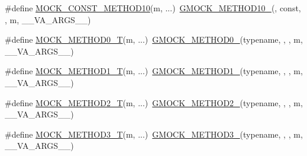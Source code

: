 \begin{DoxyCompactItemize}
\item 
\#define \mbox{\hyperlink{_obj__test_2lib_2googletest-master_2googlemock_2include_2gmock_2gmock-generated-function-mockers_8h_a4f16ede0ef660fb6dc49e5f5d226fbf9}{M\+O\+C\+K\+\_\+\+C\+O\+N\+S\+T\+\_\+\+M\+E\+T\+H\+O\+D10}}(m, ...)~\mbox{\hyperlink{_obj__test_2lib_2googletest-release-1_88_81_2googlemock_2include_2gmock_2gmock-generated-function-mockers_8h_a81a48223a8771de36ef92ac6d56f6e81}{G\+M\+O\+C\+K\+\_\+\+M\+E\+T\+H\+O\+D10\+\_\+}}(, const, , m, \+\_\+\+\_\+\+V\+A\+\_\+\+A\+R\+G\+S\+\_\+\+\_\+)
\item 
\#define \mbox{\hyperlink{_obj__test_2lib_2googletest-master_2googlemock_2include_2gmock_2gmock-generated-function-mockers_8h_a55a5a1a22cec416ead5605a2da39eec8}{M\+O\+C\+K\+\_\+\+M\+E\+T\+H\+O\+D0\+\_\+T}}(m, ...)~\mbox{\hyperlink{_obj__test_2lib_2googletest-release-1_88_81_2googlemock_2include_2gmock_2gmock-generated-function-mockers_8h_ae0d290ffa58d7c624b2e3487ba1252f4}{G\+M\+O\+C\+K\+\_\+\+M\+E\+T\+H\+O\+D0\+\_\+}}(typename, , , m, \+\_\+\+\_\+\+V\+A\+\_\+\+A\+R\+G\+S\+\_\+\+\_\+)
\item 
\#define \mbox{\hyperlink{_obj__test_2lib_2googletest-master_2googlemock_2include_2gmock_2gmock-generated-function-mockers_8h_a8e5b9539726be5c7a13f1aa3bcc1f29f}{M\+O\+C\+K\+\_\+\+M\+E\+T\+H\+O\+D1\+\_\+T}}(m, ...)~\mbox{\hyperlink{_obj__test_2lib_2googletest-release-1_88_81_2googlemock_2include_2gmock_2gmock-generated-function-mockers_8h_a1bc0012d62440dda77208dabdf4925c9}{G\+M\+O\+C\+K\+\_\+\+M\+E\+T\+H\+O\+D1\+\_\+}}(typename, , , m, \+\_\+\+\_\+\+V\+A\+\_\+\+A\+R\+G\+S\+\_\+\+\_\+)
\item 
\#define \mbox{\hyperlink{_obj__test_2lib_2googletest-master_2googlemock_2include_2gmock_2gmock-generated-function-mockers_8h_adb6e8d8bd6ab614c62d8ecc2ec163e3c}{M\+O\+C\+K\+\_\+\+M\+E\+T\+H\+O\+D2\+\_\+T}}(m, ...)~\mbox{\hyperlink{_obj__test_2lib_2googletest-release-1_88_81_2googlemock_2include_2gmock_2gmock-generated-function-mockers_8h_a885295ca6bebb15efb3fc786218c5d47}{G\+M\+O\+C\+K\+\_\+\+M\+E\+T\+H\+O\+D2\+\_\+}}(typename, , , m, \+\_\+\+\_\+\+V\+A\+\_\+\+A\+R\+G\+S\+\_\+\+\_\+)
\item 
\#define \mbox{\hyperlink{_obj__test_2lib_2googletest-master_2googlemock_2include_2gmock_2gmock-generated-function-mockers_8h_a0b1576f68e6161f106e3d9ee7e3ac28b}{M\+O\+C\+K\+\_\+\+M\+E\+T\+H\+O\+D3\+\_\+T}}(m, ...)~\mbox{\hyperlink{_obj__test_2lib_2googletest-release-1_88_81_2googlemock_2include_2gmock_2gmock-generated-function-mockers_8h_af7c77ba511c631de02bb8c45a6ed3045}{G\+M\+O\+C\+K\+\_\+\+M\+E\+T\+H\+O\+D3\+\_\+}}(typename, , , m, \+\_\+\+\_\+\+V\+A\+\_\+\+A\+R\+G\+S\+\_\+\+\_\+)

\end{DoxyCompactItemize}
